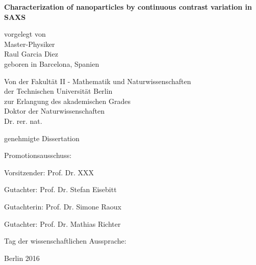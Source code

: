 
\begin{titlepage}
{\noindent\sffamily\large%
    \begin{center}
        \vspace*{3ex}
        {\LARGE\bfseries\sffamily
            Characterization of nanoparticles by continuous contrast variation in SAXS
        }
        \vspace{1cm}

        vorgelegt von \\
        Master-Physiker \\
        Raul Garcia Diez \\
        geboren in Barcelona, Spanien \\
        \vspace{4cm}

        Von der Fakultät II - Mathematik und Naturwissenschaften \\
        der Technischen Universität Berlin \\
        zur Erlangung des akademischen Grades \\
        Doktor der Naturwissenschaften \\
        Dr. rer. nat. \\
        \vspace{3ex}

        genehmigte Dissertation \\
        \vspace{2cm}
    \end{center}

    Promotionsausschuss:
    \vspace{2ex}

    Vorsitzender: Prof. Dr. XXX

    Gutachter: Prof. Dr. Stefan Eisebitt

    Gutachterin: Prof. Dr. Simone Raoux

    Gutachter: Prof. Dr. Mathias Richter
    \vspace{1ex}

    Tag der wissenschaftlichen Aussprache:

    \vfill
    \begin{center}
        Berlin 2016
    \end{center}
}
\end{titlepage}

\cleardoublepage

